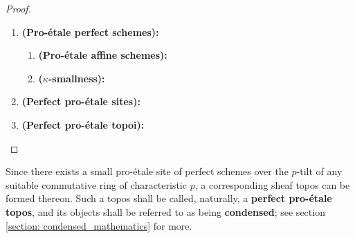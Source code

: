                         \begin{proof}
                            \noindent
                            \begin{enumerate}
                                \item \textbf{(Pro-\'etale perfect schemes):}
                                    \begin{enumerate}
                                        \item \textbf{(Pro-\'etale affine schemes):} 
                                        \item \textbf{($\kappa$-smallness):}
                                    \end{enumerate}
                                \item \textbf{(Perfect pro-\'etale sites):}
                                \item \textbf{(Perfect pro-\'etale topoi):}
                            \end{enumerate}
                        \end{proof}
                    \begin{corollary} \label{coro: pro_etale_topoi}
                        Since there exists a small pro-\'etale site of perfect schemes over the $p$-tilt of any suitable commutative ring of characteristic $p$, a corresponding sheaf topos can be formed thereon. Such a topos shall be called, naturally, a \textbf{perfect pro-\'etale topos}, and its objects shall be referred to as being \textbf{condensed}; see section \ref{section: condensed_mathematics} for more. 
                    \end{corollary}
